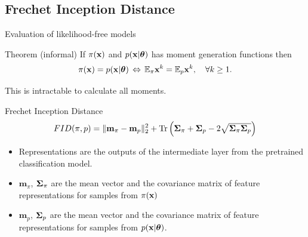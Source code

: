 \subsection{Frechet Inception Distance}
\begin{frame}{Evaluation of likelihood-free models}
	\begin{block}{Theorem (informal)}
		If $\pi(\mathbf{x})$ and $p(\mathbf{x} | \boldsymbol{\theta})$ has moment generation functions then
		\vspace{-0.1cm}
		\[
			\pi(\mathbf{x}) = p(\mathbf{x} | \boldsymbol{\theta}) \, \Leftrightarrow \, \mathbb{E}_{\pi} \mathbf{x}^k = \mathbb{E}_{p} \mathbf{x}^k, \quad \forall k \geq 1.
		\]
		\vspace{-0.7cm}
	\end{block}
	This is intractable to calculate all moments.
	\begin{block}{Frechet Inception Distance}
		\vspace{-0.3cm}
		\[
			FID (\pi, p) = \| \mathbf{m}_{\pi} - \mathbf{m}_{p}\|_2^2 + \text{Tr} \left( \boldsymbol{\Sigma}_{\pi} + \boldsymbol{\Sigma}_p - 2 \sqrt{\boldsymbol{\Sigma}_{\pi} \boldsymbol{\Sigma}_p} \right)
		\]
		\vspace{-0.5cm}
	\end{block}
	\begin{itemize}
		\item Representations are the outputs of the intermediate layer from the pretrained classification model.
		\item $\mathbf{m}_{\pi}$, $\boldsymbol{\Sigma}_{\pi} $ are the mean vector and the covariance matrix of feature representations for samples from $\pi(\mathbf{x})$
		\item $\mathbf{m}_{p}$, $\boldsymbol{\Sigma}_p$ are the mean vector and the covariance matrix of feature representations for samples from $p(\mathbf{x} | \boldsymbol{\theta})$.
	\end{itemize} 

\end{frame}

